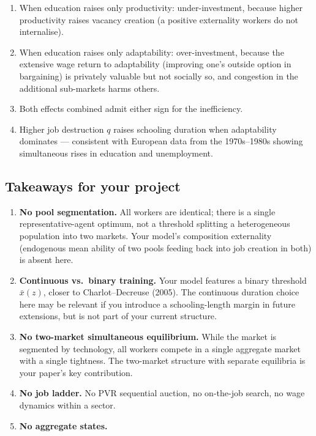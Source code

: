 \documentclass[12pt]{article}
\begin{document}
\begin{enumerate}
    \item When education raises only productivity: under-investment, because higher productivity raises vacancy creation (a positive externality workers do not internalise).
    \item When education raises only adaptability: over-investment, because the extensive wage return to adaptability (improving one's outside option in bargaining) is privately valuable but not socially so, and congestion in the additional sub-markets harms others.
    \item Both effects combined admit either sign for the inefficiency.
    \item Higher job destruction $q$ raises schooling duration when adaptability dominates --- consistent with European data from the 1970s--1980s showing simultaneous rises in education and unemployment.
\end{enumerate}

\subsection*{Takeaways for your project}

\begin{enumerate}
    \item \textbf{No pool segmentation.} All workers are identical; there is a single representative-agent optimum, not a threshold splitting a heterogeneous population into two markets. Your model's composition externality (endogenous mean ability of two pools feeding back into job creation in both) is absent here.

    \item \textbf{Continuous vs.\ binary training.} Your model features a binary threshold $\bar{x}(z)$, closer to Charlot--Decreuse (2005). The continuous duration choice here may be relevant if you introduce a schooling-length margin in future extensions, but is not part of your current structure.

    \item \textbf{No two-market simultaneous equilibrium.} While the market is segmented by technology, all workers compete in a single aggregate market with a single tightness. The two-market structure with separate equilibria is your paper's key contribution.

    \item \textbf{No job ladder.} No PVR sequential auction, no on-the-job search, no wage dynamics within a sector.

    \item \textbf{No aggregate states.}
\end{enumerate}
\end{document}
